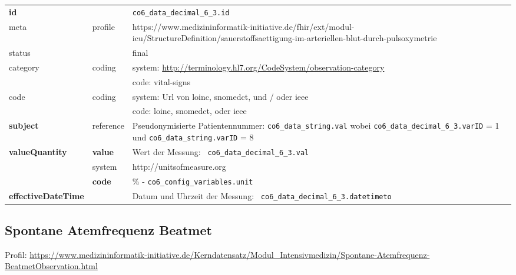 \begin{longtable}{|l|l|p{7.5cm}|}
        \hline
        \rowcolor{lightgray} \multicolumn{3}{|l|}{Data Mapping (inhaltlich)} \\ \hline
        \textbf{id} &  & \texttt{co6\_data\_decimal\_6\_3.id} \\ \hline
	meta & profile & https://www.medizininformatik-initiative.de/fhir/ext/modul-icu/StructureDefinition/sauerstoffsaettigung-im-arteriellen-blut-durch-pulsoxymetrie \\ \hline 
	status &  & final   \\ \hline 
	category & coding & system: \url{http://terminology.hl7.org/CodeSystem/observation-category} \\
\cline{3-3}
	& & code: vital-signs \\ \hline
	code & coding & system: Url von \ac{loinc}, \ac{snomedct}, und / oder \ac{ieee} \\ 
	\cline{3-3} 
	 &  & code: \ac{loinc}, \ac{snomedct}, oder \ac{ieee} \\ \hline
	\textbf{subject} & reference & Pseudonymisierte Patientennummer: \texttt{co6\_data\_string.val} wobei \texttt{co6\_data\_decimal\_6\_3.varID} = 1 und \texttt{co6\_data\_string.varID} = 8 \\ \hline
	 \textbf{valueQuantity}  & \textbf{value} & Wert der Messung: \texttt{
co6\_data\_decimal\_6\_3.val} \\
        \cline{2-3}
         & system & http://unitsofmeasure.org \\
         \cline{2-3}
         & \textbf{code} & \% - \texttt{co6\_config\_variables.unit} \\ \hline
     \textbf{effectiveDateTime}  & & Datum und Uhrzeit der Messung: \texttt{
co6\_data\_decimal\_6\_3.datetimeto} \\
     \hline
\end{longtable}


\subsection{Spontane Atemfrequenz Beatmet} 

Profil: \url{https://www.medizininformatik-initiative.de/Kerndatensatz/Modul_Intensivmedizin/Spontane-Atemfrequenz-BeatmetObservation.html}

